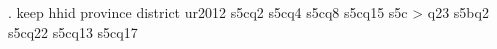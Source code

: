 . keep hhid province district ur2012 s5cq2 s5cq4 s5cq8 s5cq15 s5c
> q23 s5bq2 s5cq22 s5cq13 s5cq17 
{\smallskip}
